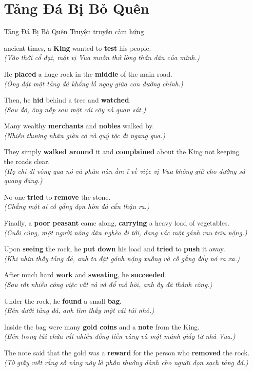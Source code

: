 \section{Tảng Đá Bị Bỏ Quên}
\begin{truyen}{Tảng Đá Bị Bỏ Quên}%
              {Truyện truyền cảm hứng}

 ancient times, a \textbf{King} wanted to \textbf{test} his people.\\
\textit{(Vào thời cổ đại, một vị Vua muốn thử lòng thần dân của mình.)}

He \textbf{placed} a huge rock in the \textbf{middle} of the main road.\\
\textit{(Ông đặt một tảng đá khổng lồ ngay giữa con đường chính.)}

Then, he \textbf{hid} behind a tree and \textbf{watched}.\\
\textit{(Sau đó, ông nấp sau một cái cây và quan sát.)}

Many wealthy \textbf{merchants} and \textbf{nobles} walked by.\\
\textit{(Nhiều thương nhân giàu có và quý tộc đi ngang qua.)}

They simply \textbf{walked around} it and \textbf{complained} about the King not keeping the roads clear.\\
\textit{(Họ chỉ đi vòng qua nó và phàn nàn ầm ĩ về việc vị Vua không giữ cho đường sá quang đãng.)}

No one \textbf{tried} to \textbf{remove} the stone.\\
\textit{(Chẳng một ai cố gắng dọn hòn đá cẩn thận ra.)}

Finally, a \textbf{poor peasant} came along, \textbf{carrying} a heavy load of vegetables.\\
\textit{(Cuối cùng, một người nông dân nghèo đi tới, đang vác một gánh rau trĩu nặng.)}

Upon \textbf{seeing} the rock, he \textbf{put down} his load and \textbf{tried} to \textbf{push} it away.\\
\textit{(Khi nhìn thấy tảng đá, anh ta đặt gánh nặng xuống và cố gắng đẩy nó ra xa.)}

After much hard \textbf{work} and \textbf{sweating}, he \textbf{succeeded}.\\
\textit{(Sau rất nhiều công việc vất vả và đổ mồ hôi, anh ấy đã thành công.)}

Under the rock, he \textbf{found} a small \textbf{bag}.\\
\textit{(Bên dưới tảng đá, anh tìm thấy một cái túi nhỏ.)}

Inside the bag were many \textbf{gold coins} and a \textbf{note} from the King.\\
\textit{(Bên trong túi chứa rất nhiều đồng tiền vàng và một mảnh giấy từ nhà Vua.)}

The note said that the gold was a \textbf{reward} for the person who \textbf{removed} the rock.\\
\textit{(Tờ giấy viết rằng số vàng này là phần thưởng dành cho người dọn sạch tảng đá.)}
\end{truyen}

